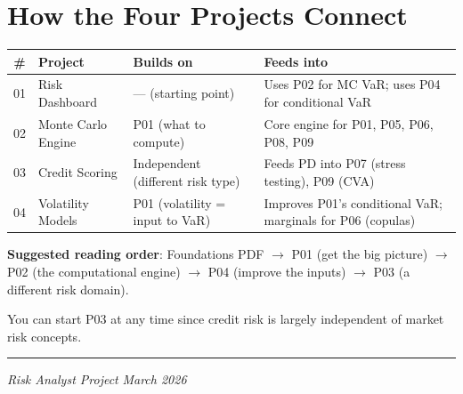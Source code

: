 \documentclass[11pt, a4paper]{article}
\begin{document}
\section{How the Four Projects Connect}

\begin{center}
\begin{tabular}{@{}cp{3.5cm}p{4cm}p{4cm}@{}}
\toprule
\textbf{\#} & \textbf{Project} & \textbf{Builds on} & \textbf{Feeds into} \\
\midrule
01 & Risk Dashboard & --- (starting point) & Uses P02 for MC VaR; uses P04 for conditional VaR \\
02 & Monte Carlo Engine & P01 (what to compute) & Core engine for P01, P05, P06, P08, P09 \\
03 & Credit Scoring & Independent (different risk type) & Feeds PD into P07 (stress testing), P09 (CVA) \\
04 & Volatility Models & P01 (volatility = input to VaR) & Improves P01's conditional VaR; marginals for P06 (copulas) \\
\bottomrule
\end{tabular}
\end{center}

\textbf{Suggested reading order}: Foundations PDF $\to$ P01 (get the big picture) $\to$ P02 (the computational engine) $\to$ P04 (improve the inputs) $\to$ P03 (a different risk domain).

You can start P03 at any time since credit risk is largely independent of market risk concepts.

\vfill
\hrule
\smallskip
\noindent\textit{Risk Analyst Project} \hfill \textit{March 2026}
\end{document}
